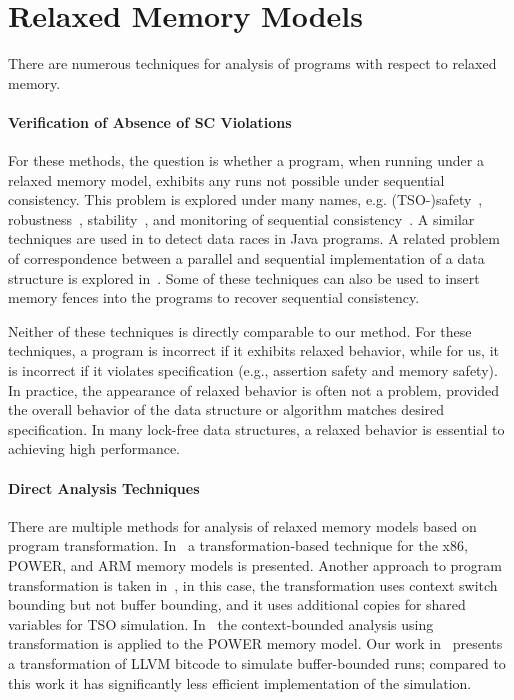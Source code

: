 \section{Relaxed Memory Models}

There are numerous techniques for analysis of programs with respect to relaxed memory.

\paragraph{Verification of Absence of SC Violations}

For these methods, the question is whether a program, when running under a relaxed memory model, exhibits any runs not possible under sequential consistency.
This problem is explored under many names, e.g. (TSO-)safety~\cite{Burckhardt2008}, robustness~\cite{Bouajjani2013,Derevenetc2014}, stability~\cite{Alglave2011}, and monitoring of sequential consistency~\cite{Burnim2011}.
A similar techniques are used in \cite{Yang2004} to detect data races in Java programs.
A related problem of correspondence between a parallel and sequential implementation of a data structure is explored in~\cite{Ou2017}.
Some of these techniques can also be used to insert memory fences into the programs to recover sequential consistency.

Neither of these techniques is directly comparable to our method.
For these techniques, a program is incorrect if it exhibits relaxed behavior, while for us, it is incorrect if it violates specification (e.g., assertion safety and memory safety).
In practice, the appearance of relaxed behavior is often not a problem, provided the overall behavior of the data structure or algorithm matches desired specification.
In many lock-free data structures, a relaxed behavior is essential to achieving high performance.

\paragraph{Direct Analysis Techniques}

There are multiple methods for analysis of relaxed memory models based on program transformation.
In~\cite{Alglave2013} a transformation-based technique for the x86, POWER, and ARM memory models is presented.
Another approach to program transformation is taken in~\cite{Atig2011}, in this case, the transformation uses context switch bounding but not buffer bounding, and it uses additional copies for shared variables for TSO simulation.
In~\cite{Abdulla2017} the context-bounded analysis using transformation is applied to the POWER memory model.
Our work in~\cite{SRB15weakmem} presents a transformation of LLVM bitcode to simulate buffer-bounded \xtso runs; compared to this work it has significantly less efficient implementation of the \xtso simulation.

